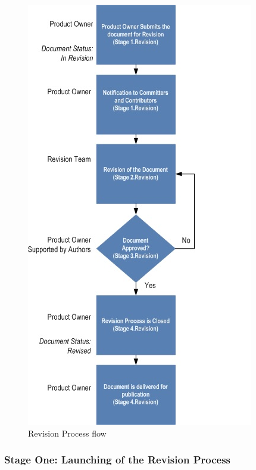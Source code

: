 \documentclass{template/openetcs_article}
\begin{document}
\begin{figure}[H]
\centering
\includegraphics{./figures/RevisionProcess.JPG}
\caption{Revision Process flow}
\end{figure}

\subsubsection{Stage One: Launching of the Revision Process}
\end{document}
